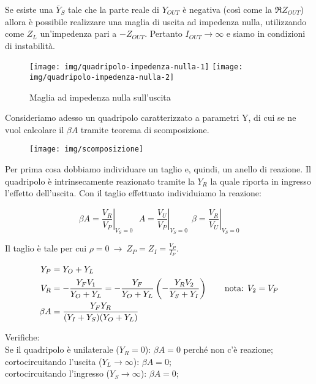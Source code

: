 Se esiste una $\overline{Y}_S$ tale che la parte reale di $Y_{OUT}$ è negativa (così come la $\Re{Z_{OUT}}$) allora è possibile realizzare una maglia di uscita ad impedenza nulla, utilizzando come $Z_L$ un'impedenza pari a $-Z_{OUT}$. Pertanto $I_{OUT}\rightarrow \infty$ e siamo in condizioni di instabilità.

\begin{figure}[tbh]
	\centering
	\hspace{\fill}
	\texttt{[image: img/quadripolo-impedenza-nulla-1]}
	\hspace{\fill}
	\texttt{[image: img/quadripolo-impedenza-nulla-2]}
	\hspace{\fill}
	\caption{Maglia ad impedenza nulla sull'uscita}
	\label{fig:instabilita}
\end{figure}

Consideriamo adesso un quadripolo caratterizzato a parametri Y, di cui se ne vuol calcolare il $\beta A$ tramite teorema di scomposizione.

\begin{figure}[h!]
\centering
\texttt{[image: img/scomposizione]}
\caption{}
\label{fig:stabilita-quadripolo-taglio1}
\end{figure}

Per prima cosa dobbiamo individuare un taglio e, quindi, un anello di reazione. Il quadripolo è
intrinsecamente reazionato tramite la $Y_R$ la quale riporta in ingresso l'effetto dell'uscita.
Con il taglio effettuato individuiamo la reazione:

$$\beta A = \left. \frac{V_R}{V_P} \right|_{V_S=0}  ~~~
A = \left. \frac{V_U}{V_P} \right|_{V_S=0}~~
\beta = \left. \frac{V_R}{V_U} \right|_{V_S=0}$$

Il taglio è tale per cui $\rho = 0 ~ \rightarrow ~ Z_P = Z_I = \frac{V_P}{I_P}$.

\begin{align}
Y_P &= Y_O + Y_L
\nonumber\\
V_R &= -\frac{Y_F V_1}{Y_O + Y_L} = -\frac{Y_F}{Y_O + Y_L} \left( - \frac{Y_R V_2}{Y_S+Y_I} \right) \qquad \mbox{nota: } V_2 = V_P
\nonumber\\
\beta A &= \frac{Y_F Y_R}{(Y_I + Y_S)(Y_O+Y_L)}
\end{align}

Verifiche:\\
Se il quadripolo è unilaterale ($Y_R = 0$): $\beta A = 0$ perché non c'è reazione;\\
cortocircuitando l'uscita ($Y_L \rightarrow \infty$): $\beta A = 0$;\\
cortocircuitando l'ingresso ($Y_S \rightarrow \infty$): $\beta A = 0$;


